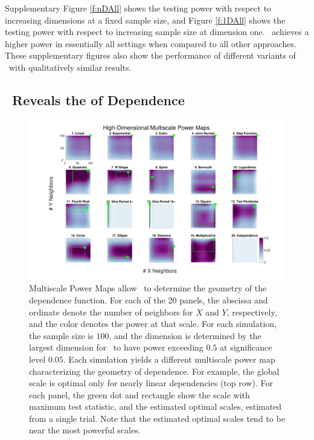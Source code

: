 \documentclass[11pt]{article}
\begin{document}
Supplementary Figure \ref{f:nDAll} shows the testing power with respect to increasing dimensions at a fixed sample size, and Figure \ref{f:1DAll} shows the testing power with respect to increasing sample size at dimension one. \Mgc~achieves a higher power in essentially all settings when compared to all other approaches. These supplementary figures also show the performance of different variants of \Mgc~with qualitatively similar results.

\subsection*{\Mgc~Reveals the  of Dependence}
\label{main3}

\begin{figure}[!ht]
\includegraphics[width=1.0\textwidth,trim={3cm 0.5cm 2.3cm 0.5cm},clip]{Figures/FigHDHeat}
\caption{Multiscale Power Maps allow \Mgc~to determine the geometry of the dependence function.
For each of the 20 panels, the abscissa and ordinate denote the number of neighbors for $X$ and  $Y$, respectively, and the color denotes the power at that scale. For each simulation, the sample size is $100$,  and the dimension is determined by the largest dimension for \Mgc~to have power exceeding $0.5$ at significance level $0.05$. Each simulation yields a different multiscale power map characterizing the geometry of dependence. 
For example, the global scale is optimal only for nearly linear dependencies (top row). 
For each panel, the green dot and rectangle show the scale with maximum test statistic,  and the estimated optimal scales, estimated from a single trial. Note that the estimated optimal scales tend to be near the most powerful scales.
}
\label{f:powermaps}
\end{figure}
\end{document}
